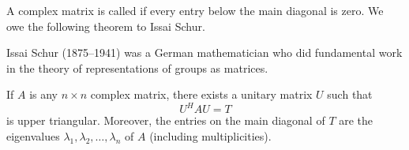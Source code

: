 \documentclass{ximera}
\begin{document}
A complex matrix is called  if every entry below the main diagonal is zero. We owe the following theorem to Issai Schur.
\begin{remark}
Issai
 Schur (1875--1941) was a German mathematician who did fundamental work
in the theory of representations of groups as matrices.
\end{remark} 

\begin{theorem}\label{th:025814}
If $A$ is any $n \times n$ complex matrix, there exists a unitary matrix $U$ such that
\begin{equation*}
U^HAU = T
\end{equation*}
is upper triangular. Moreover, the entries on the main diagonal of $T$ are the eigenvalues $\lambda_{1}, \lambda_{2}, \ldots, \lambda_{n}$ of $A$ (including multiplicities).
\end{theorem}
\end{document}
